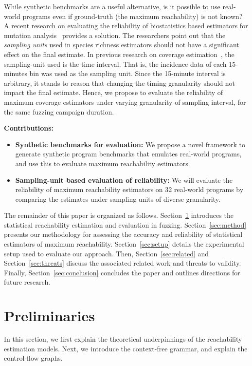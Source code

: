 \documentclass[conference,anonymous,review]{IEEEtran}
\begin{document}
While synthetic benchmarks are a useful alternative, is it possible to use
real-world programs even if ground-truth (the maximum reachability) is not
known? A recent research on evaluating the reliability of biostatistics based
estimators for mutation analysis~\cite{Kuznetsov2024empirical} provides a
solution. The researchers point out that the \emph{sampling units} used in
species richness estimators should not have a significant effect on the final
estimate. In previous research on coverage estimation~\cite{liyanage2023reachable},
the sampling-unit used is the time interval. That is, the incidence data of
each 15-minutes bin was used as the sampling unit. Since the 15-minute interval
is arbitrary, it stands to reason that changing the timing granularity should
not impact the final estimate. Hence, we propose to evaluate the reliability of
maximum coverage estimators under varying granularity of sampling interval,
for the same fuzzing campaign duration.

\noindent{}\textbf{Contributions:}

\begin{itemize}
  \item \textbf{Synthetic benchmarks for evaluation:} We propose a novel
framework to generate synthetic program benchmarks that emulates real-world
programs, and use this to evaluate maximum reachability estimators.

  \item \textbf{Sampling-unit based evaluation of reliability:} We will evaluate
    the reliability of maximum reachability estimators on 32 real-world programs
    by comparing the estimates under sampling units of diverse granularity.

\end{itemize}

The remainder of this paper is organized as follows. Section~\ref{sec:preliminaries} introduces the statistical reachability estimation and evaluation in fuzzing. Section~\ref{sec:method} presents our methodology for assessing the accuracy and reliability of statistical estimators of maximum reachability. Section~\ref{sec:setup} details the experimental setup used to evaluate our approach. Then, Section~\ref{sec:related} and Section~\ref{sec:threats} discuss the associated related work and threats to validity. Finally, Section~\ref{sec:conclusion} concludes the paper and outlines directions for future research.

\section{Preliminaries} \label{sec:preliminaries}
In this section, we first explain the theoretical underpinnings of the reachability estimation models. Next, we introduce the context-free grammar, and explain
the control-flow graphs.
\end{document}

